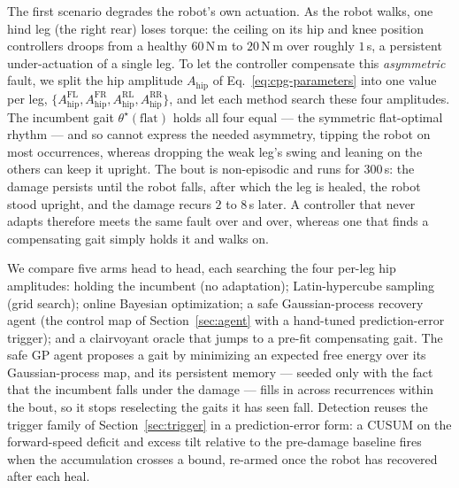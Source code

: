 \documentclass[letterpaper, 10 pt, conference]{ieeeconf}  %
\begin{document}
The first scenario degrades the robot's own actuation.
As the robot walks, one hind leg (the right rear) loses torque: the ceiling on its hip and knee position controllers droops from a healthy $60$\,N\,m to $20$\,N\,m over roughly $1$\,s, a persistent under-actuation of a single leg.
To let the controller compensate this \emph{asymmetric} fault, we split the hip amplitude $A_{\text{hip}}$ of Eq.~\ref{eq:cpg-parameters} into one value per leg, $\{A_{\text{hip}}^{\text{FL}}, A_{\text{hip}}^{\text{FR}}, A_{\text{hip}}^{\text{RL}}, A_{\text{hip}}^{\text{RR}}\}$, and let each method search these four amplitudes.
The incumbent gait $\theta^{\star}(\text{flat})$ holds all four equal --- the symmetric flat-optimal rhythm --- and so cannot express the needed asymmetry, tipping the robot on most occurrences, whereas dropping the weak leg's swing and leaning on the others can keep it upright.
The bout is non-episodic and runs for $300$\,s: the damage persists until the robot falls, after which the leg is healed, the robot stood upright, and the damage recurs $2$ to $8$\,s later.
A controller that never adapts therefore meets the same fault over and over, whereas one that finds a compensating gait simply holds it and walks on.

We compare five arms head to head, each searching the four per-leg hip amplitudes: holding the incumbent (no adaptation); Latin-hypercube sampling (grid search); online Bayesian optimization; a safe Gaussian-process recovery agent (the control map of Section~\ref{sec:agent} with a hand-tuned prediction-error trigger); and a clairvoyant oracle that jumps to a pre-fit compensating gait.
The safe GP agent proposes a gait by minimizing an expected free energy over its Gaussian-process map, and its persistent memory --- seeded only with the fact that the incumbent falls under the damage --- fills in across recurrences within the bout, so it stops reselecting the gaits it has seen fall.
Detection reuses the trigger family of Section~\ref{sec:trigger} in a prediction-error form: a CUSUM on the forward-speed deficit and excess tilt relative to the pre-damage baseline fires when the accumulation crosses a bound, re-armed once the robot has recovered after each heal.
\end{document}
